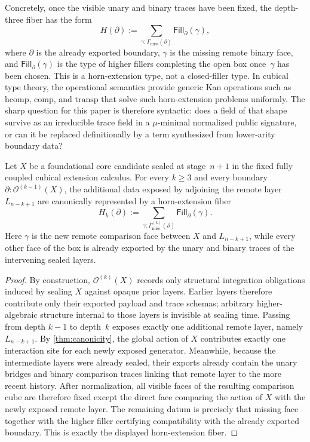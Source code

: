 \documentclass{lmcs}
\newcommand{\Ocal}{\mathcal{O}}
\newcommand{\hcomp}{\mathrm{hcomp}}
\newcommand{\compop}{\mathrm{comp}}
\newcommand{\transp}{\mathrm{transp}}
\begin{document}
Concretely, once the visible unary and binary traces have been fixed, the depth-three fiber has the form
\[
  H(\partial)
  :=
  \sum_{\gamma : \Gamma_{\mathrm{miss}}(\partial)}
  \mathsf{Fill}_{\partial}(\gamma),
\]
where $\partial$ is the already exported boundary, $\gamma$ is the missing remote binary face, and $\mathsf{Fill}_{\partial}(\gamma)$ is the type of higher fillers completing the open box once~$\gamma$ has been chosen. This is a horn-extension type, not a closed-filler type. In cubical type theory, the operational semantics provide generic Kan operations such as $\hcomp$, $\compop$, and $\transp$ that solve such horn-extension problems uniformly. The sharp question for this paper is therefore syntactic: does a field of that shape survive as an irreducible trace field in a $\mu$-minimal normalized public signature, or can it be replaced definitionally by a term synthesized from lower-arity boundary data?

\begin{lem}
\label{lem:horn-reduction}
Let $X$ be a foundational core candidate sealed at stage~$n+1$ in the fixed fully coupled cubical extension calculus. For every $k \geq 3$ and every boundary $\partial : \Ocal^{(k-1)}(X)$, the additional data exposed by adjoining the remote layer $L_{n-k+1}$ are canonically represented by a horn-extension fiber
\[
  H_k(\partial)
  :=
  \sum_{\gamma : \Gamma^{(k)}_{\mathrm{miss}}(\partial)}
  \mathsf{Fill}_{\partial}(\gamma).
\]
Here $\gamma$ is the new remote comparison face between $X$ and $L_{n-k+1}$, while every other face of the box is already exported by the unary and binary traces of the intervening sealed layers.
\end{lem}

\begin{proof}
By construction, $\Ocal^{(k)}(X)$ records only structural integration obligations induced by sealing $X$ against opaque prior layers. Earlier layers therefore contribute only their exported payload and trace schemas; arbitrary higher-algebraic structure internal to those layers is invisible at sealing time. Passing from depth $k-1$ to depth~$k$ exposes exactly one additional remote layer, namely $L_{n-k+1}$. By \autoref{thm:canonicity}, the global action of $X$ contributes exactly one interaction site for each newly exposed generator. Meanwhile, because the intermediate layers were already sealed, their exports already contain the unary bridges and binary comparison traces linking that remote layer to the more recent history. After normalization, all visible faces of the resulting comparison cube are therefore fixed except the direct face comparing the action of $X$ with the newly exposed remote layer. The remaining datum is precisely that missing face together with the higher filler certifying compatibility with the already exported boundary. This is exactly the displayed horn-extension fiber.
\end{proof}
\end{document}
